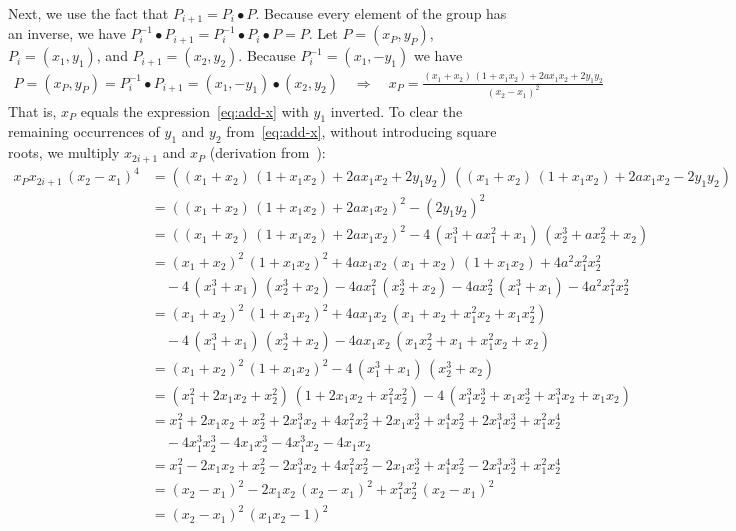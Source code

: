 \documentclass{article}
\begin{document}
Next, we use the fact that $P_{i+1} = P_i \bullet P$.
Because every element of the group has an inverse, we have $P_i^{-1} \bullet P_{i+1} = P_i^{-1} \bullet P_i \bullet P = P$.
Let $P = (x_P, y_P)$, $P_i = (x_1, y_1)$, and $P_{i+1} = (x_2, y_2)$.
Because $P_i^{-1} = (x_1, -y_1)$ we have
\begin{align*}
P = (x_P, y_P) = P_i^{-1} \bullet P_{i+1} = (x_1, -y_1) \bullet (x_2, y_2) \quad\Longrightarrow\quad
x_P = \frac{(x_1 + x_2)\,(1 + x_1 x_2) + 2a x_1 x_2 + 2y_1 y_2}{(x_2 - x_1)^2}
\end{align*}
That is, $x_P$ equals the expression~\eqref{eq:add-x} with $y_1$ inverted.
To clear the remaining occurrences of $y_1$ and $y_2$ from~\eqref{eq:add-x}, without introducing square roots, we multiply $x_{2i+1}$ and $x_P$ (derivation from~\cite{Bernstein:2017fm}):
\begin{align*}
x_P x_{2i+1}\,(x_2 - x_1)^4 &=
    ((x_1 + x_2)\,(1 + x_1 x_2) + 2a x_1 x_2 + 2y_1 y_2)\,((x_1 + x_2)\,(1 + x_1 x_2) + 2a x_1 x_2 - 2y_1 y_2) \\
&= ((x_1 + x_2)\,(1 + x_1 x_2) + 2a x_1 x_2)^2 - (2y_1 y_2)^2 \\
&= ((x_1 + x_2)\,(1 + x_1 x_2) + 2a x_1 x_2)^2 - 4\,(x_1^3 + ax_1^2 + x_1)\,(x_2^3 + ax_2^2 + x_2) \\
&= (x_1 + x_2)^2\, (1 + x_1 x_2)^2 + 4ax_1 x_2\,(x_1 + x_2)\,(1 + x_1 x_2) + 4a^2 x_1^2 x_2^2 \\
    &\quad -4\,(x_1^3 + x_1)\,(x_2^3 + x_2) - 4ax_1^2\,(x_2^3 + x_2) - 4ax_2^2\,(x_1^3 + x_1) - 4a^2 x_1^2 x_2^2 \\
&= (x_1 + x_2)^2\, (1 + x_1 x_2)^2 + 4ax_1 x_2\,(x_1 + x_2 + x_1^2 x_2 + x_1 x_2^2) \\
    &\quad -4\,(x_1^3 + x_1)\,(x_2^3 + x_2) - 4ax_1 x_2\,(x_1 x_2^2 + x_1 + x_1^2 x_2 + x_2) \\
&= (x_1 + x_2)^2\, (1 + x_1 x_2)^2 - 4\,(x_1^3 + x_1)\,(x_2^3 + x_2) \\
&= (x_1^2 + 2x_1 x_2 + x_2^2)\,(1 + 2x_1 x_2 + x_1^2 x_2^2) - 4\,(x_1^3 x_2^3 + x_1 x_2^3 + x_1^3 x_2 + x_1 x_2) \\
&= x_1^2 + 2x_1 x_2 + x_2^2 + 2x_1^3 x_2 + 4x_1^2 x_2^2 + 2x_1 x_2^3 + x_1^4 x_2^2 + 2x_1^3 x_2^3 + x_1^2 x_2^4 \\
    &\quad - 4x_1^3 x_2^3 - 4x_1 x_2^3 - 4x_1^3 x_2 - 4x_1 x_2 \\
&= x_1^2 - 2x_1 x_2 + x_2^2 - 2x_1^3 x_2 + 4x_1^2 x_2^2 - 2x_1 x_2^3 + x_1^4 x_2^2 - 2x_1^3 x_2^3 + x_1^2 x_2^4 \\
&= (x_2 - x_1)^2 - 2x_1 x_2\,(x_2 - x_1)^2 + x_1^2 x_2^2\,(x_2 - x_1)^2 \\
&= (x_2 - x_1)^2\,(x_1 x_2 - 1)^2
\end{align*}
\end{document}
